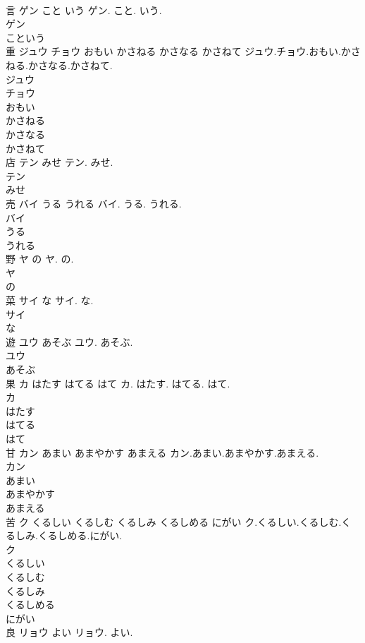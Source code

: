 \documentclass[8pt]{extreport}
\begin{document}
\begin{CJK}{UTF8}{min}
\\	言	ゲン こと いう	ゲン. こと. いう.	
\\	ゲン
\\	こという
\\	重	ジュウ チョウ おもい かさねる かさなる かさねて	ジュウ.チョウ.おもい.かさねる.かさなる.かさねて.	
\\	ジュウ
\\	チョウ
\\	おもい
\\	かさねる
\\	かさなる
\\	かさねて
\\	店	テン みせ	テン. みせ.	
\\	テン
\\	みせ
\\	売	バイ うる うれる	バイ. うる. うれる.	
\\	バイ
\\	うる
\\	うれる
\\	野	ヤ の	ヤ. の.	
\\	ヤ
\\	の
\\	菜	サイ な	サイ. な.	
\\	サイ
\\	な
\\	遊	ユウ あそぶ	ユウ. あそぶ.	
\\	ユウ
\\	あそぶ
\\	果	カ はたす はてる はて	カ. はたす. はてる. はて.	
\\	カ
\\	はたす
\\	はてる
\\	はて
\\	甘	カン あまい あまやかす あまえる	カン.あまい.あまやかす.あまえる.	
\\	カン
\\	あまい
\\	あまやかす
\\	あまえる
\\	苦	ク くるしい くるしむ くるしみ くるしめる にがい	ク.くるしい.くるしむ.くるしみ.くるしめる.にがい.	
\\	ク
\\	くるしい
\\	くるしむ
\\	くるしみ
\\	くるしめる
\\	にがい
\\	良	リョウ よい	リョウ. よい.	

\end{CJK}
\end{document}
